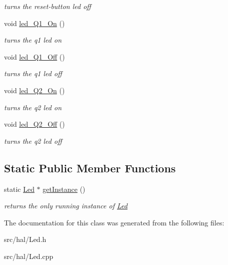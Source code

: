 \begin{DoxyCompactItemize}
\begin{DoxyCompactList}\small\item\em turns the reset-\/button led off \end{DoxyCompactList}\item 
\hypertarget{classLed_a8d188ba11a0c97cc01389a83d66003a5}{void \hyperlink{classLed_a8d188ba11a0c97cc01389a83d66003a5}{led\-\_\-\-Q1\-\_\-\-On} ()}\label{classLed_a8d188ba11a0c97cc01389a83d66003a5}

\begin{DoxyCompactList}\small\item\em turns the q1 led on \end{DoxyCompactList}\item 
\hypertarget{classLed_a49f3d340c9ce2ca8edc1483678c2ef97}{void \hyperlink{classLed_a49f3d340c9ce2ca8edc1483678c2ef97}{led\-\_\-\-Q1\-\_\-\-Off} ()}\label{classLed_a49f3d340c9ce2ca8edc1483678c2ef97}

\begin{DoxyCompactList}\small\item\em turns the q1 led off \end{DoxyCompactList}\item 
\hypertarget{classLed_a9dbd288be5f39d9b7f01c873593d4f1f}{void \hyperlink{classLed_a9dbd288be5f39d9b7f01c873593d4f1f}{led\-\_\-\-Q2\-\_\-\-On} ()}\label{classLed_a9dbd288be5f39d9b7f01c873593d4f1f}

\begin{DoxyCompactList}\small\item\em turns the q2 led on \end{DoxyCompactList}\item 
\hypertarget{classLed_a75b30e02b600f8c2237053f86fe17da7}{void \hyperlink{classLed_a75b30e02b600f8c2237053f86fe17da7}{led\-\_\-\-Q2\-\_\-\-Off} ()}\label{classLed_a75b30e02b600f8c2237053f86fe17da7}

\begin{DoxyCompactList}\small\item\em turns the q2 led off \end{DoxyCompactList}\end{DoxyCompactItemize}
\subsection*{Static Public Member Functions}
\begin{DoxyCompactItemize}
\item 
\hypertarget{classLed_ab7c85469a3885c9ec891daca461f3a16}{static \hyperlink{classLed}{Led} $\ast$ \hyperlink{classLed_ab7c85469a3885c9ec891daca461f3a16}{get\-Instance} ()}\label{classLed_ab7c85469a3885c9ec891daca461f3a16}

\begin{DoxyCompactList}\small\item\em returns the only running instance of \hyperlink{classLed}{Led} \end{DoxyCompactList}\end{DoxyCompactItemize}


The documentation for this class was generated from the following files\-:\begin{DoxyCompactItemize}
\item 
src/hal/Led.\-h\item 
src/hal/Led.\-cpp\end{DoxyCompactItemize}
